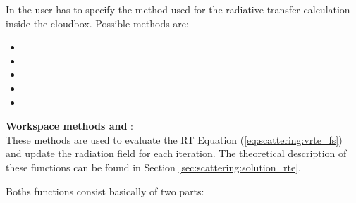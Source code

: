 In  the user has to specify the method used for the radiative transfer calculation inside the cloudbox.
Possible methods are:
\begin{itemize}
\item {}
\item {}
\item {}
\item {}
\item {}
\end{itemize}

{\bf  Workspace methods  and }:\\

These methods are used to evaluate the RT Equation
(\ref{eq:scattering:vrte_fs}) and update the radiation field
 for each iteration. The theoretical description of
these functions can be found in Section
\ref{sec:scattering:solution_rte}.

Boths functions consist basically of two parts:

